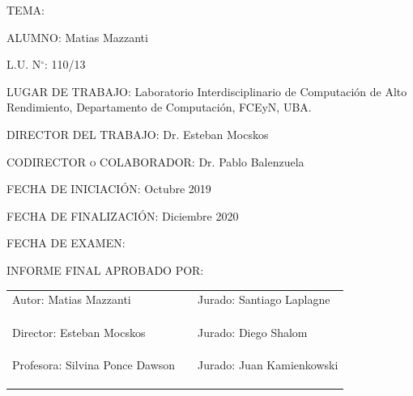 \documentclass[11pt,twoside,spanish]{report} %
\begin{document}
\begin{center}
	\raggedright
	\textsc{TEMA:}

	\bigskip

	\textsc{ALUMNO:} Matias Mazzanti

	\bigskip

	\textsc{L.U. N$^{\circ}$:} 110/13

	\bigskip

	\textsc{LUGAR DE TRABAJO:} Laboratorio Interdisciplinario de Computaci\'on de
	Alto Rendimiento, Departamento de Computaci\'on, FCEyN, UBA.


	\bigskip

	\textsc{DIRECTOR DEL TRABAJO:} Dr. Esteban Mocskos

	\bigskip

	\textsc{CODIRECTOR o COLABORADOR:} Dr. Pablo Balenzuela

	\bigskip

	\textsc{FECHA DE INICIACI\'ON:} Octubre 2019

	\bigskip

	\textsc{FECHA DE FINALIZACI\'ON:} Diciembre 2020

	\bigskip

	{\large FECHA DE EXAMEN: }

	\bigskip

	\textsc{INFORME FINAL APROBADO POR:}
	\vfill

	\begin{center}
		\begin{tabular}{lll}
			\cline{1-1}\cline{1-1}\cline{3-3}\cline{3-3}%
			Autor: Matias Mazzanti  & \hspace{2cm} & Jurado: Santiago Laplagne \\ 
			&& \\
			&& \\
			&& \\
			\cline{1-1}\cline{1-1}\cline{3-3}\cline{3-3}%
			Director: Esteban Mocskos & \hspace{2cm}  & Jurado: Diego Shalom \\
			&& \\
			&& \\
			&& \\
			\cline{1-1}\cline{1-1}\cline{3-3}\cline{3-3}%
			Profesora: Silvina Ponce Dawson  & \hspace{2cm} & Jurado: Juan Kamienkowski \\
			&& \\
			&& \\
			&& 
		\end{tabular}
	\end{center}

\end{center}
\end{document}
